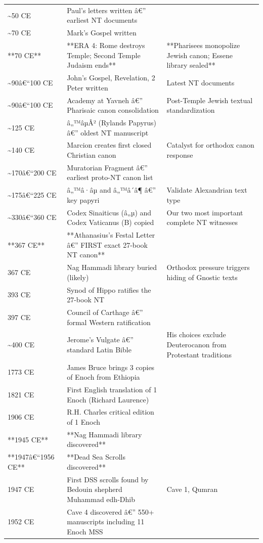 \documentclass[aps,prd,11pt,onecolumn,superscriptaddress,nofootinbib,floatfix]{revtex4-2}
\begin{document}
\begin{table}[h!]
\begin{tabular}{p{3cm}p{3cm}p{3cm}}
\textasciitilde{}50 CE & Paul's letters written â€'' earliest NT documents &  \\
\textasciitilde{}70 CE & Mark's Gospel written &  \\
**70 CE** & **ERA 4: Rome destroys Temple; Second Temple Judaism ends** & **Pharisees monopolize Jewish canon; Essene library sealed** \\
\textasciitilde{}90â€``100 CE & John's Gospel, Revelation, 2 Peter written & Latest NT documents \\
\textasciitilde{}90â€``100 CE & Academy at Yavneh â€'' Pharisaic canon consolidation & Post-Temple Jewish textual standardization \\
\textasciitilde{}125 CE & â„™âµÂ² (Rylands Papyrus) â€'' oldest NT manuscript &  \\
\textasciitilde{}140 CE & Marcion creates first closed Christian canon & Catalyst for orthodox canon response \\
\textasciitilde{}170â€``200 CE & Muratorian Fragment â€'' earliest proto-NT canon list &  \\
\textasciitilde{}175â€``225 CE & â„™â·âµ and â„™â´â¶ â€'' key papyri & Validate Alexandrian text type \\
\textasciitilde{}330â€``360 CE & Codex Sinaiticus (â„µ) and Codex Vaticanus (B) copied & Our two most important complete NT witnesses \\
**367 CE** & **Athanasius's Festal Letter â€'' FIRST exact 27-book NT canon** &  \\
367 CE & Nag Hammadi library buried (likely) & Orthodox pressure triggers hiding of Gnostic texts \\
393 CE & Synod of Hippo ratifies the 27-book NT &  \\
397 CE & Council of Carthage â€'' formal Western ratification &  \\
\textasciitilde{}400 CE & Jerome's Vulgate â€'' standard Latin Bible & His choices exclude Deuterocanon from Protestant traditions \\
1773 CE & James Bruce brings 3 copies of Enoch from Ethiopia &  \\
1821 CE & First English translation of 1 Enoch (Richard Laurence) &  \\
1906 CE & R.H. Charles critical edition of 1 Enoch &  \\
**1945 CE** & **Nag Hammadi library discovered** &  \\
**1947â€``1956 CE** & **Dead Sea Scrolls discovered** &  \\
1947 CE & First DSS scrolls found by Bedouin shepherd Muhammad edh-Dhib & Cave 1, Qumran \\
1952 CE & Cave 4 discovered â€'' 550+ manuscripts including 11 Enoch MSS &  \\
\hline
\end{tabular}
\end{table}
\end{document}
